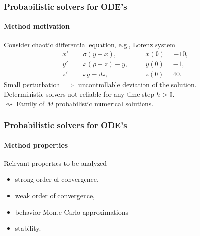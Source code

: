 \documentclass{beamer}
\begin{document}
\begin{frame}
	\frametitle{Probabilistic solvers for ODE's}
	\framesubtitle{Method motivation}
	
	Consider chaotic differential equation, e.g., Lorenz system
	\begin{equation*}\label{eq:Lorenz}
	\begin{aligned}
		x' &= \sigma(y - x), \quad &&x(0) = -10,\\
		y' &= x(\rho - z) - y, \quad &&y(0) = -1,\\
		z' &= xy - \beta z, \quad &&z(0) = 40.
	\end{aligned}
	\end{equation*}
	Small perturbation $\implies$ uncontrollable deviation of the solution. \\
	Deterministic solvers not reliable for any time step $h > 0$. \\
	$\rightsquigarrow$ Family of $M$ probabilistic numerical solutions.
\end{frame}

\begin{frame}
	\frametitle{Probabilistic solvers for ODE's}
	\framesubtitle{Method properties}
	
	Relevant properties to be analyzed
	\begin{itemize}
		\item strong order of convergence,
		\item weak order of convergence,
		\item behavior Monte Carlo approximations,
		\item stability.
	\end{itemize}
	
\end{frame}
\end{document}
